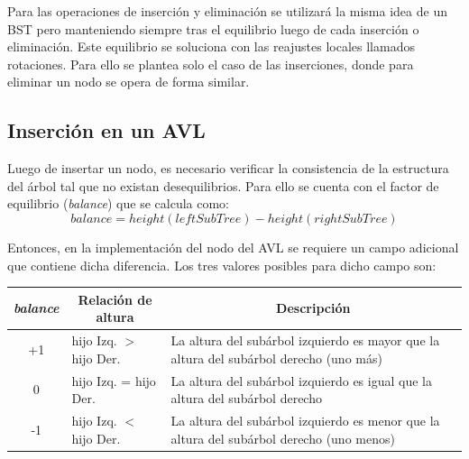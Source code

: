 Para las operaciones de inserción y eliminación se utilizará la misma idea de un BST pero manteniendo siempre tras el equilibrio luego de cada inserción o eliminación. Este equilibrio se soluciona con las reajustes locales llamados rotaciones. Para ello se plantea solo el caso de las inserciones, donde para eliminar un nodo se opera de forma similar.

\subsection{Inserción en un AVL}

Luego de insertar un nodo, es necesario verificar la consistencia de la estructura del árbol tal que no existan desequilibrios. Para ello se cuenta con el factor de equilibrio (\textit{balance}) que se calcula como:
$$balance = height(leftSubTree) - height(rightSubTree)$$

Entonces, en la implementación del nodo del AVL se requiere un campo adicional que contiene dicha diferencia. Los tres valores posibles para dicho campo son:
\begin{table}[h]
\begin{tabular}{cll}
\hline
\textit{balance} & \multicolumn{1}{c}{Relación de altura} & \multicolumn{1}{c}{Descripción}                                                          \\ \hline
+1      & hijo Izq. $>$ hijo Der.       & La altura del subárbol izquierdo es mayor que la altura del subárbol derecho (uno más) \\
0       & hijo Izq. = hijo Der.                  & La altura del subárbol izquierdo es igual que la altura del subárbol derecho             \\
-1      & hijo Izq. $<$ hijo Der.          & La altura del subárbol izquierdo es menor que la altura del subárbol derecho (uno menos)
\end{tabular}
\end{table}

